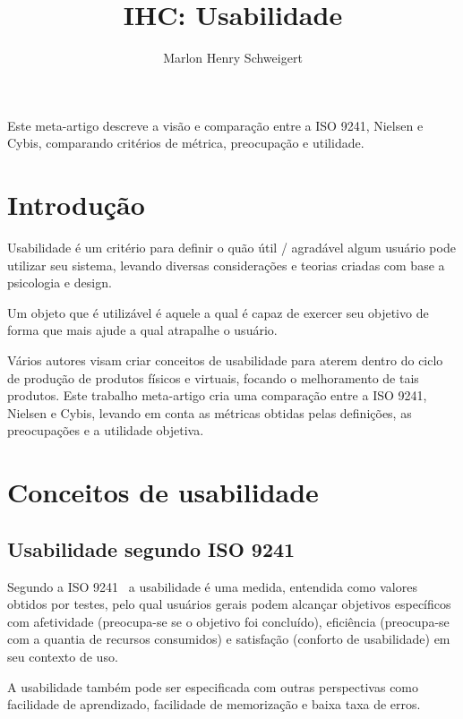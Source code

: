 \documentclass[12pt]{article}
\title{IHC: Usabilidade}
\author{Marlon Henry Schweigert \inst{1}}
\begin{document}
 

\maketitle
     
\begin{resumo} 
  Este meta-artigo descreve a visão e comparação entre a ISO 9241, Nielsen e Cybis, comparando critérios de métrica, preocupação e utilidade.
\end{resumo}


\section{Introdução}

Usabilidade é um critério para definir o quão útil / agradável algum usuário pode utilizar seu sistema, levando diversas considerações e teorias criadas com base a psicologia e design.

Um objeto que é utilizável é aquele a qual é capaz de exercer seu objetivo de forma que mais ajude a qual atrapalhe o usuário.

Vários autores visam criar conceitos de usabilidade para aterem dentro do ciclo de produção de produtos físicos e virtuais, focando o melhoramento de tais produtos. Este trabalho meta-artigo cria uma comparação entre a ISO 9241, Nielsen e Cybis, levando em conta as métricas obtidas pelas definições, as preocupações e a utilidade objetiva.

\section{Conceitos de usabilidade} \label{sec:conceitos}

\subsection{Usabilidade segundo ISO 9241}

Segundo a ISO 9241~\cite{international1998iso} a usabilidade é uma medida, entendida como valores obtidos por testes, pelo qual usuários gerais podem alcançar objetivos específicos com afetividade (preocupa-se se o objetivo foi concluído), eficiência (preocupa-se com a quantia de recursos consumidos) e satisfação (conforto de usabilidade) em seu contexto de uso.

A usabilidade também pode ser especificada com outras perspectivas como facilidade de aprendizado, facilidade de memorização e baixa taxa de erros.
\end{document}
